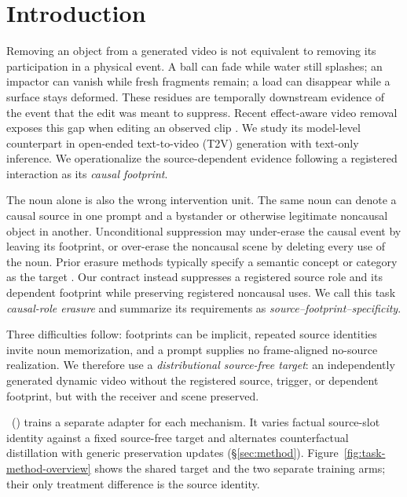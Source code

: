 \section{Introduction}
\label{sec:introduction}

Removing an object from a generated video is not equivalent to removing its
participation in a physical event.  A ball can fade while water still
splashes; an impactor can vanish while fresh fragments remain; a load can
disappear while a surface stays deformed.  These residues are temporally
downstream evidence of the event that the edit was meant to suppress.  Recent
effect-aware video removal exposes this gap when editing an observed clip
\citep{motamed2026void,ekin2026beyondmasks}.
We study its model-level counterpart in open-ended text-to-video (T2V)
generation with text-only inference.  We operationalize the source-dependent
evidence following a registered interaction as its \emph{causal footprint}.

The noun alone is also the wrong intervention unit.  The same noun can denote
a causal source in one prompt and a bystander or otherwise legitimate
noncausal object in another.  Unconditional suppression may under-erase the
causal event by leaving its footprint, or over-erase the noncausal scene by
deleting every use of the noun.  Prior erasure methods typically specify a
semantic concept or category as the target
\citep{gandikota2023esd,xu2025videoeraser}.  Our contract instead suppresses a
registered source role and its dependent footprint while preserving
registered noncausal uses.  We call this task \emph{causal-role erasure} and
summarize its requirements as \emph{source--footprint--specificity}.

Three difficulties follow: footprints can be implicit, repeated source
identities invite noun memorization, and a prompt supplies no frame-aligned
no-source realization.  We therefore use a \emph{distributional source-free
target}: an independently generated dynamic video without the registered
source, trigger, or dependent footprint, but with the receiver and scene
preserved.

\methodname\ (\methodshort) trains a separate adapter for each mechanism.
It varies factual source-slot identity against a fixed source-free target and
alternates counterfactual distillation with generic preservation updates
(\S\ref{sec:method}). Figure~\ref{fig:task-method-overview} shows the shared
target and the two separate training arms; their only treatment difference
is the source identity.

